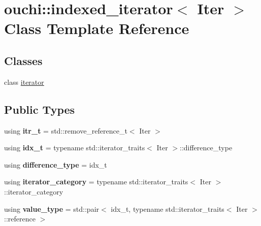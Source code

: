 \hypertarget{classouchi_1_1indexed__iterator}{}\section{ouchi\+::indexed\+\_\+iterator$<$ Iter $>$ Class Template Reference}
\label{classouchi_1_1indexed__iterator}
\subsection*{Classes}
\begin{DoxyCompactItemize}
\item 
class \mbox{\hyperlink{classouchi_1_1indexed__iterator_1_1iterator}{iterator}}
\end{DoxyCompactItemize}
\subsection*{Public Types}
\begin{DoxyCompactItemize}
\item 
\mbox{\label{classouchi_1_1indexed__iterator_a6ee292167179fa48dadca307543c3365}} 
using {\bfseries itr\+\_\+t} = std\+::remove\+\_\+reference\+\_\+t$<$ Iter $>$
\item 
\mbox{\label{classouchi_1_1indexed__iterator_a8ad7bc8ab15c26c84ab5a2d3a71c7be3}} 
using {\bfseries idx\+\_\+t} = typename std\+::iterator\+\_\+traits$<$ Iter $>$\+::difference\+\_\+type
\item 
\mbox{\label{classouchi_1_1indexed__iterator_ae018c538187efbe96abfbb61cb78aa88}} 
using {\bfseries difference\+\_\+type} = idx\+\_\+t
\item 
\mbox{\label{classouchi_1_1indexed__iterator_a9a3f4ad6435c25ecd6009321b7f03272}} 
using {\bfseries iterator\+\_\+category} = typename std\+::iterator\+\_\+traits$<$ Iter $>$\+::iterator\+\_\+category
\item 
\mbox{\label{classouchi_1_1indexed__iterator_ab967b2b7726e26bb5459a086cc3ffd3c}} 
using {\bfseries value\+\_\+type} = std\+::pair$<$ idx\+\_\+t, typename std\+::iterator\+\_\+traits$<$ Iter $>$\+::reference $>$
\end{DoxyCompactItemize}
